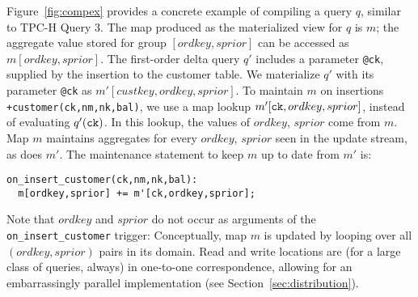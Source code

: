 Figure~\ref{fig:compex} provides a concrete example of compiling a query $q$,
similar to TPC-H Query 3. 
The map produced as the materialized view for $q$ is $m$; the
aggregate value stored for group $[ordkey,sprior]$ can be accessed as
$m[ordkey,sprior]$.
The first-order delta query $q'$ includes a
parameter {\tt @ck}, supplied by the insertion to the customer table.
We materialize $q'$ with its parameter {\tt @ck} as $m'[custkey,ordkey,sprior]$.
To maintain $m$ on insertions {\tt +customer(ck,nm,nk,bal)}, we use
a map lookup $m'[\mbox{{\tt ck}},ordkey,sprior]$, instead of evaluating
$q'(\mbox{{\tt ck}})$. In this lookup, the values of $ordkey$, $sprior$ come
from $m$. Map $m$ maintains aggregates for every $ordkey$, $sprior$ seen in the
update stream, as does $m'$. The maintenance statement to keep $m$ up to date
from $m'$ is:


{\footnotesize
\begin{verbatim}
on_insert_customer(ck,nm,nk,bal):
  m[ordkey,sprior] += m'[ck,ordkey,sprior];
\end{verbatim}
}

\noindent
Note that $ordkey$ and $sprior$ do not occur as arguments of the
{\tt on\_insert\_customer} trigger: Conceptually, map $m$ is updated by
looping over all $(ordkey, sprior)$ pairs in its domain.
Read and write locations are (for a large class of queries, always) in one-to-one correspondence, allowing for
an embarrassingly parallel implementation
(see Section~\ref{sec:distribution}).

